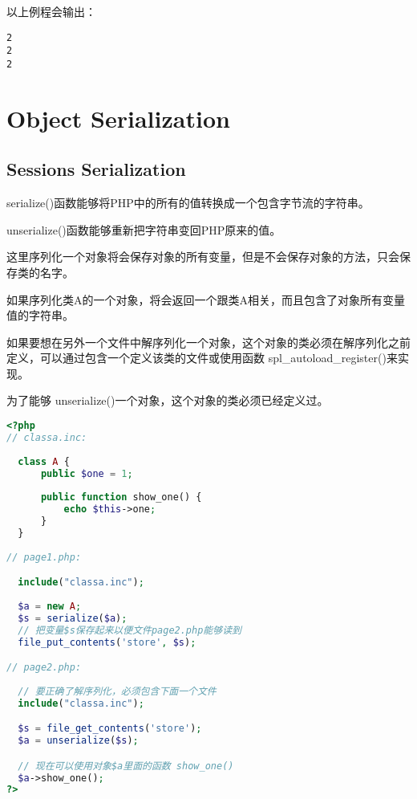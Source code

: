以上例程会输出：

\begin{verbatim}
2
2
2
\end{verbatim}


\chapter{Object Serialization}


\section{Sessions Serialization}

\begin{compactitem}
\item serialize()函数能够将PHP中的所有的值转换成一个包含字节流的字符串。
\item unserialize()函数能够重新把字符串变回PHP原来的值。
\end{compactitem}


这里序列化一个对象将会保存对象的所有变量，但是不会保存对象的方法，只会保存类的名字。



\begin{compactitem}
\item 如果序列化类A的一个对象，将会返回一个跟类A相关，而且包含了对象所有变量值的字符串。
\item 如果要想在另外一个文件中解序列化一个对象，这个对象的类必须在解序列化之前定义，可以通过包含一个定义该类的文件或使用函数 spl\_autoload\_register()来实现。
\end{compactitem}

为了能够 unserialize()一个对象，这个对象的类必须已经定义过。

\begin{lstlisting}[language=PHP]
<?php
// classa.inc:
  
  class A {
      public $one = 1;
    
      public function show_one() {
          echo $this->one;
      }
  }
  
// page1.php:

  include("classa.inc");
  
  $a = new A;
  $s = serialize($a);
  // 把变量$s保存起来以便文件page2.php能够读到
  file_put_contents('store', $s);

// page2.php:
  
  // 要正确了解序列化，必须包含下面一个文件
  include("classa.inc");

  $s = file_get_contents('store');
  $a = unserialize($s);

  // 现在可以使用对象$a里面的函数 show_one()
  $a->show_one();
?>
\end{lstlisting}

